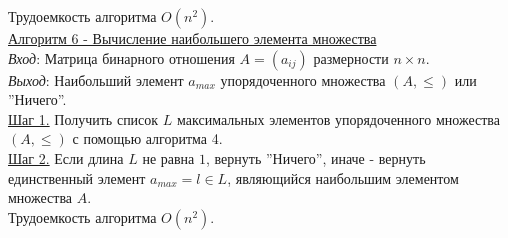 \documentclass[bachelor, och, labwork]{shiza}
\begin{document}
            Трудоемкость алгоритма $O(n^2)$.\\

        \underline{Алгоритм 6 - Вычисление наибольшего элемента множества}\\
            \textit{Вход}: Матрица бинарного отношения $A = (a_{ij})$ размерности $n \times n$.\\
            \textit{Выход}: Наибольший элемент $a_{max}$ упорядоченного множества $(A, \leq)$ или ''Ничего''.\\
            \underline{Шаг 1.} Получить список $L$ максимальных элементов упорядоченного множества $(A, \leq)$ с помощью
            алгоритма 4. \\
            \underline{Шаг 2.} Если длина $L$ не равна $1$, вернуть ''Ничего'', иначе - вернуть единственный элемент
            $a_{max} = l \in L$, являющийся наибольшим элементом множества $A$.\\
                
            Трудоемкость алгоритма $O(n^2)$.\\
\end{document}
